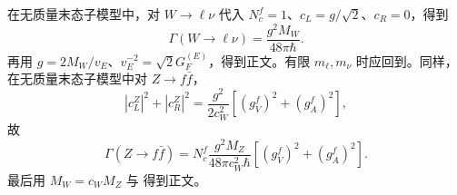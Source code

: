 \begin{derivation}[有质量费米子末态的矢量衰变宽度]
在无质量末态子模型中，对 $W\to\ell\nu$ 代入 $N_c^f=1$、$c_L=g/\sqrt2$、$c_R=0$，得到
\begin{equation*}
 \Gamma(W\to\ell\nu)=\frac{g^2M_W}{48\pi\hbar}.
\end{equation*}
再用 $g=2M_W/v_E$、$v_E^{-2}=\sqrt2G_F^{(E)}$，得到正文。有限 $m_\ell,m_\nu$ 时应回到。同样，在无质量末态子模型中对 $Z\to f\bar f$，
\begin{equation*}
 |c_L^Z|^2+|c_R^Z|^2
 =\frac{g^2}{2c_W^2}\left[(g_V^f)^2+(g_A^f)^2\right],
\end{equation*}
故
\begin{equation*}
 \Gamma(Z\to f\bar f)
 =N_c^f\frac{g^2M_Z}{48\pi c_W^2\hbar}
 \left[(g_V^f)^2+(g_A^f)^2\right].
\end{equation*}
最后用 $M_W=c_WM_Z$ 与 得到正文。
\end{derivation}
